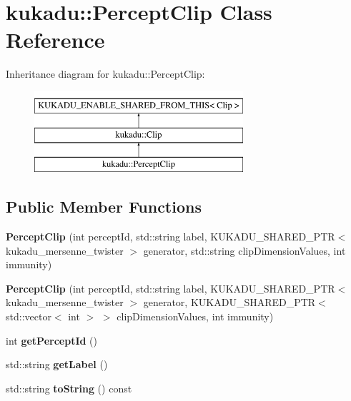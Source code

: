 \hypertarget{classkukadu_1_1PerceptClip}{\section{kukadu\-:\-:Percept\-Clip Class Reference}
\label{classkukadu_1_1PerceptClip}
}
Inheritance diagram for kukadu\-:\-:Percept\-Clip\-:\begin{figure}[H]
\begin{center}
\leavevmode
\includegraphics[height=3.000000cm]{classkukadu_1_1PerceptClip}
\end{center}
\end{figure}
\subsection*{Public Member Functions}
\begin{DoxyCompactItemize}
\item 
\hypertarget{classkukadu_1_1PerceptClip_a18ff9cf7013be05bea25d0e7ba0e272e}{{\bfseries Percept\-Clip} (int percept\-Id, std\-::string label, K\-U\-K\-A\-D\-U\-\_\-\-S\-H\-A\-R\-E\-D\-\_\-\-P\-T\-R$<$ kukadu\-\_\-mersenne\-\_\-twister $>$ generator, std\-::string clip\-Dimension\-Values, int immunity)}\label{classkukadu_1_1PerceptClip_a18ff9cf7013be05bea25d0e7ba0e272e}

\item 
\hypertarget{classkukadu_1_1PerceptClip_a905864f6f22c81aade26d9175163ae49}{{\bfseries Percept\-Clip} (int percept\-Id, std\-::string label, K\-U\-K\-A\-D\-U\-\_\-\-S\-H\-A\-R\-E\-D\-\_\-\-P\-T\-R$<$ kukadu\-\_\-mersenne\-\_\-twister $>$ generator, K\-U\-K\-A\-D\-U\-\_\-\-S\-H\-A\-R\-E\-D\-\_\-\-P\-T\-R$<$ std\-::vector$<$ int $>$ $>$ clip\-Dimension\-Values, int immunity)}\label{classkukadu_1_1PerceptClip_a905864f6f22c81aade26d9175163ae49}

\item 
\hypertarget{classkukadu_1_1PerceptClip_a6b2d4730c539f4e7799c8cccb444b0ab}{int {\bfseries get\-Percept\-Id} ()}\label{classkukadu_1_1PerceptClip_a6b2d4730c539f4e7799c8cccb444b0ab}

\item 
\hypertarget{classkukadu_1_1PerceptClip_a45e3eb6fe71f0d00296e7e66561d2003}{std\-::string {\bfseries get\-Label} ()}\label{classkukadu_1_1PerceptClip_a45e3eb6fe71f0d00296e7e66561d2003}

\item 
\hypertarget{classkukadu_1_1PerceptClip_a4b973f8d0ea8b6fa5f996935fdc11b3e}{std\-::string {\bfseries to\-String} () const }\label{classkukadu_1_1PerceptClip_a4b973f8d0ea8b6fa5f996935fdc11b3e}

\end{DoxyCompactItemize}
